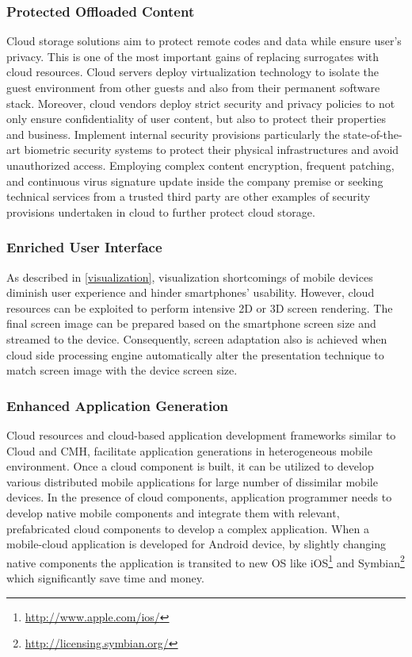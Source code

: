 \documentclass[publish]{IEEEtran}
\begin{document}
\subsubsection{Protected Offloaded Content}
Cloud storage solutions aim to protect remote codes and data while ensure user's privacy. This is one of the most important gains of replacing surrogates with cloud resources. Cloud servers deploy virtualization technology to isolate the guest environment from other guests and also from their permanent software stack. Moreover, cloud vendors deploy strict security and privacy policies to not only ensure confidentiality of user content, but also to protect their properties and business. Implement internal security provisions particularly the state-of-the-art biometric security systems to protect their physical infrastructures and avoid unauthorized access. Employing complex content encryption, frequent patching, and continuous virus signature update inside the company premise or seeking technical services from a trusted third party \cite{Yang2011a} are other examples of security provisions undertaken in cloud to further protect cloud storage.  

\subsubsection{Enriched User Interface}
As described in \ref{visualization}, visualization shortcomings of mobile devices diminish user experience and hinder smartphones' usability. However, cloud resources can be exploited to perform intensive 2D or 3D screen rendering. The final screen image can be prepared based on the smartphone screen size and streamed to the device. Consequently, screen adaptation also is achieved when cloud side processing engine automatically alter the presentation technique to match screen image with the device screen size.

\subsubsection{Enhanced Application Generation}
Cloud resources and cloud-based application development frameworks similar to Cloud and CMH, facilitate application generations in heterogeneous mobile environment. Once a cloud component is built, it can be utilized to develop various distributed mobile applications for large number of dissimilar mobile devices. In the presence of cloud components, application programmer needs to develop native mobile components and integrate them with relevant, prefabricated cloud components to develop a complex application. When a mobile-cloud application is developed for Android device, by slightly changing native components the application is transited to new OS like iOS\footnote{\url{http://www.apple.com/ios/}} and Symbian\footnote{\url{http://licensing.symbian.org/}} which significantly save time and money.
\end{document}
